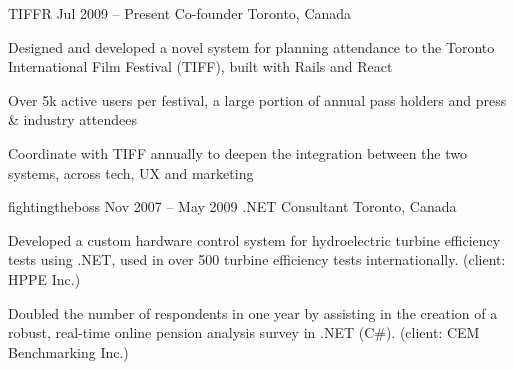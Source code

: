 \documentclass[10pt]{article}
\begin{document}
{	\job
	{TIFFR}
	{Jul 2009 – Present}
	{Co-founder}
	{Toronto, Canada}
	{\begin{newitemize}
		\item {Designed and developed a novel system for planning attendance to the Toronto International Film Festival (TIFF), built with Rails and React}
		\item {Over 5k active users per festival, a large portion of annual pass holders and press \& industry attendees}
		\item {Coordinate with TIFF annually to deepen the integration between the two systems, across tech, UX and marketing}
		\end{newitemize}}
	\job
	{fightingtheboss}
	{Nov 2007 – May 2009}
	{.NET Consultant}
	{Toronto, Canada}
	{\begin{newitemize}
		\item {Developed a custom hardware control system for hydroelectric turbine efficiency tests using .NET, used in over 500 turbine efficiency tests internationally. (client: HPPE Inc.)}
		\item {Doubled the number of respondents in one year by assisting in the creation of a robust, real-time online pension analysis survey in .NET (C\#). (client: CEM Benchmarking Inc.)}
		\end{newitemize}}
}



\
\end{document}
